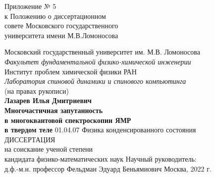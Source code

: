 \begin{titlepage}
\begin{flushright}
   Приложение № 5 \\
   к Положению о диссертационном \\
   совете Московского государственного \\
   университета имени М.В.Ломоносова
\end{flushright}
\vspace{1cm}
\begin{center}
  {\large Московский государственный университет им. М.В. Ломоносова} \\
  {\it Факультет фундаментальной физико-химической инженерии} \\
  \vspace{1cm}
  {\large Институт проблем химической физики РАН} \\
  {\it Лаборатория спиновой динамики и спинового компьютинга} \\
  \vfill
  (на правах рукописи) \\
  \vfill
  {\Large \bf Лазарев Илья Дмитриевич} \\
  \vspace{1cm}
  {\Large \bf
      Многочастичная запутанность \\
      в многоквантовой спектроскопии ЯМР \\
      \vspace{2mm}
      в твердом теле
  }
 \vfill
 01.04.07 Физика конденсированного состояния \\
 \vspace{1cm}
 ДИССЕРТАЦИЯ \\
 на соискание ученой степени \\
 кандидата физико-математических наук
 \vfill
 {\large
   Научный руководитель:\\
   д.ф.-м.н. профессор Фельдман Эдуард Беньямиович
 }
 \vfill
 Москва, 2022 г.
\end{center}
\end{titlepage}